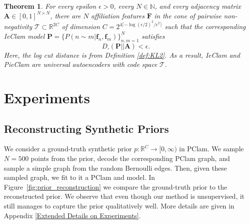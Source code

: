 \documentclass[letterpaper]{article} %
\newtheorem{theorem}{Theorem}
\begin{document}
\begin{theorem}
\label{thm:IEUniversality2}
    For every epsilon $\epsilon>0$, every $N\in\mathbb{N}$, and every adjacency matrix $\mathbf{A}\in[0,1]^{N\times N}$, there are $N$ affiliation features $\mathbf{F}$ in the cone of pairwise non-negativity  $\mathcal{T}\subset \mathbb{R}^{2C}$ of dimension  $C=2^{4\lceil -\log(\epsilon/2)^2/\epsilon^2\rceil}$  such that the corresponding IeClam model $\mathbf{P}=\{P(n\sim m|\mathbf{f}_n, \mathbf{f}_m)\}_{n,m=1}^N$ satisfies 
     \[D_{\square}(\mathbf{P} || \mathbf{A}) <\epsilon.\] 
    Here, the log cut distance is from Definition \ref{def:KL2}.
    As a result, 
    IeClam and PieClam are universal autoencoders with code space $\mathcal{T}$.
\end{theorem}


\section{Experiments}
\label{Experiments}



\subsection{Reconstructing Synthetic Priors}
\label{sec:reconstruction_prior}

We consider a ground-truth synthetic prior $p:\mathbb{R}^C\rightarrow[0,\infty)$ in PClam. %
We sample $N=500$ points from the prior, decode the corresponding PClam graph, and sample a simple graph from the random Bernoulli edges. Then, given these sampled graph, we fit to it a PClam and  model. In Figure~\ref{fig:prior_reconstruction} we compare the ground-truth prior to the reconstructed prior. We observe that even though our method is unsupervised, it still manages to capture the prior qualitatively well. More details are given in Appendix \ref{Extended Details on Experiments}.
\end{document}
